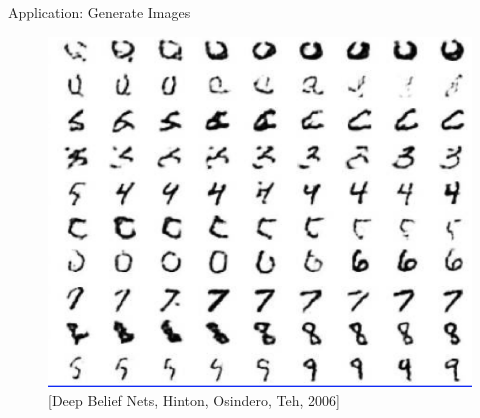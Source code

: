 \begin{frame}[allowframebreaks]{Application: Generate Images}
    \begin{figure}
    \centering
    \includegraphics[height=0.8\textheight]{images/dul/slide_19_1_img.png}
    \caption*{[Deep Belief Nets, Hinton, Osindero, Teh, 2006]}
    \end{figure}

    \framebreak


\end{frame}
